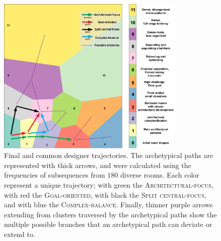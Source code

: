 \begin{figure}[t!]
\centerline{\includegraphics[width=9cm]{figures/figure4.png}}
\caption{Final and common designer trajectories. The archetypical paths are represented with thick arrows, and were calculated using the frequencies of subsequences from $180$ diverse rooms. Each color represent a unique trajectory; with green the \textsc{Architectural-focus}, with red the \textsc{Goal-oriented}, with black the \textsc{Split central-focus}, and with blue the \textsc{Complex-balance}. Finally, thinner purple arrows extending from clusters traversed by the archetypical paths show the multiple possible branches that an archetypical path can deviate or extend to.} \label{fig:finalPaths}
\end{figure}



